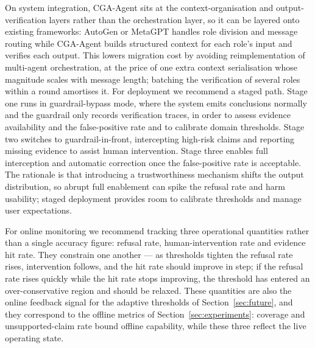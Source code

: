 \documentclass[journal,10pt,a4paper]{IEEEtran}
\begin{document}
On system integration, CGA-Agent sits at the context-organisation and output-verification layers rather than the orchestration layer, so it can be layered onto existing frameworks: AutoGen or MetaGPT handles role division and message routing while CGA-Agent builds structured context for each role's input and verifies each output. This lowers migration cost by avoiding reimplementation of multi-agent orchestration, at the price of one extra context serialisation whose magnitude scales with message length; batching the verification of several roles within a round amortises it. For deployment we recommend a staged path. Stage one runs in guardrail-bypass mode, where the system emits conclusions normally and the guardrail only records verification traces, in order to assess evidence availability and the false-positive rate and to calibrate domain thresholds. Stage two switches to guardrail-in-front, intercepting high-risk claims and reporting missing evidence to assist human intervention. Stage three enables full interception and automatic correction once the false-positive rate is acceptable. The rationale is that introducing a trustworthiness mechanism shifts the output distribution, so abrupt full enablement can spike the refusal rate and harm usability; staged deployment provides room to calibrate thresholds and manage user expectations.

For online monitoring we recommend tracking three operational quantities rather than a single accuracy figure: refusal rate, human-intervention rate and evidence hit rate. They constrain one another --- as thresholds tighten the refusal rate rises, intervention follows, and the hit rate should improve in step; if the refusal rate rises quickly while the hit rate stops improving, the threshold has entered an over-conservative region and should be relaxed. These quantities are also the online feedback signal for the adaptive thresholds of Section~\ref{sec:future}, and they correspond to the offline metrics of Section~\ref{sec:experiments}: coverage and unsupported-claim rate bound offline capability, while these three reflect the live operating state.

\end{document}
